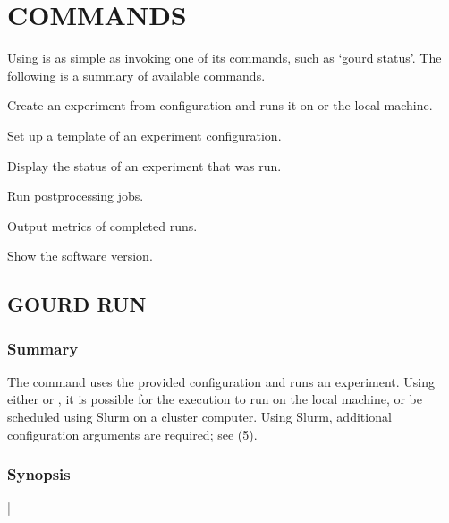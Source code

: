\documentclass[a4paper,english]{article}
\begin{document}
    \section{COMMANDS}

    Using  is as simple as invoking one of its commands, such as `gourd status'.
    The following is a summary of available commands.

    \begin{Description}[Commands]\setlength{\itemsep}{0cm}
        \item[\Prog{gourd} \Arg{run}]
        Create an experiment from configuration and runs it on  or the local machine.
        \item[\Prog{gourd} \Arg{init}]
        Set up a template of an experiment configuration.
        \item[\Prog{gourd} \Arg{status}]
        Display the status of an experiment that was run.
        \item[\Prog{gourd} \Arg{postprocess}]
        Run postprocessing jobs.
        \item[\Prog{gourd} \Arg{analyse}]
        Output metrics of completed runs.
        \item[\Prog{gourd} \Arg{version}]
        Show the software version.
    \end{Description}

    \subsection{GOURD RUN}

        \subsubsection{Summary}
        The   command uses the provided configuration and
        runs an experiment.
        Using either  or , it is possible for the execution
        to run on the local machine, or be scheduled using Slurm on a cluster computer.
        Using Slurm, additional configuration arguments are required; see (5).

        \subsubsection{Synopsis}
          |    
\end{document}
